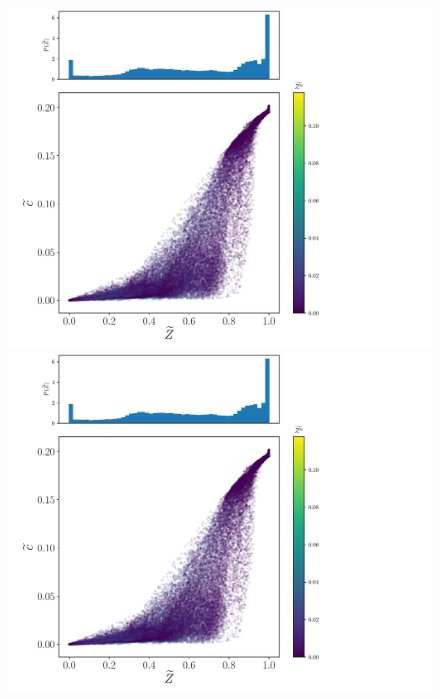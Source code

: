 \documentclass[xcolor=dvipsnames]{beamer}
\begin{document}
{\begin{figure}[!tbp]
    \includegraphics[page=2, height=0.3\textwidth, trim=1.0cm 0cm 2.4cm 0cm, clip]{./figs/inputs_dice_0005.pdf}%
    \includegraphics[page=3, height=0.3\textwidth, trim=0.0cm 0cm 2.4cm 0cm, clip]{./figs/inputs_dice_0005.pdf}%
  \end{figure}%
}
\end{document}
